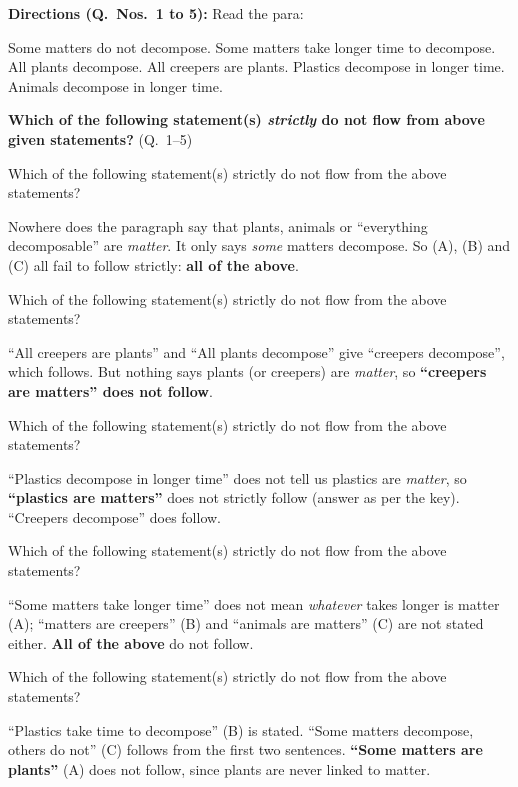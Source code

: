 \textbf{Directions (Q.~Nos.~1 to 5):} Read the para:\par\smallskip
Some matters do not decompose. Some matters take longer time to decompose. All plants decompose. All creepers are plants. Plastics decompose in longer time. Animals decompose in longer time.\par\smallskip
\textbf{Which of the following statement(s) \emph{strictly} do not flow from above given statements?} (Q.~1--5)

Which of the following statement(s) strictly do not flow from the above statements?

Nowhere does the paragraph say that plants, animals or ``everything decomposable'' are \emph{matter}. It only says \emph{some} matters decompose. So (A), (B) and (C) all fail to follow strictly: \textbf{all of the above}.

Which of the following statement(s) strictly do not flow from the above statements?

``All creepers are plants'' and ``All plants decompose'' give ``creepers decompose'', which follows. But nothing says plants (or creepers) are \emph{matter}, so \textbf{``creepers are matters'' does not follow}.

Which of the following statement(s) strictly do not flow from the above statements?

``Plastics decompose in longer time'' does not tell us plastics are \emph{matter}, so \textbf{``plastics are matters''} does not strictly follow (answer as per the key). ``Creepers decompose'' does follow.

Which of the following statement(s) strictly do not flow from the above statements?

``Some matters take longer time'' does not mean \emph{whatever} takes longer is matter (A); ``matters are creepers'' (B) and ``animals are matters'' (C) are not stated either. \textbf{All of the above} do not follow.

Which of the following statement(s) strictly do not flow from the above statements?

``Plastics take time to decompose'' (B) is stated. ``Some matters decompose, others do not'' (C) follows from the first two sentences. \textbf{``Some matters are plants''} (A) does not follow, since plants are never linked to matter.

